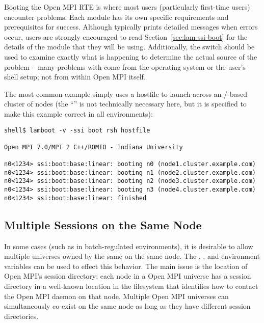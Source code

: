 Booting the Open MPI RTE is where most users (particularly first-time
users) encounter problems.  Each  module has its own
specific requirements and prerequisites for success.  Although
 typically prints detailed messages when errors occur,
users are strongly encouraged to read Section~\ref{sec:lam-ssi-boot}
for the details of the  module that they will be using.
Additionally, the  switch should be used to examine exactly
what is happening to determine the actual source of the problem --
many problems with  come from the operating system or the
user's shell setup; not from within Open MPI itself.

The most common  example simply uses a hostfile to launch
across an /-based cluster of nodes (the
``'' is not technically necessary here, but it
is specified to make this example correct in all environments):

\lstset{style=lam-cmdline}
\begin{lstlisting}
shell$ lamboot -v -ssi boot rsh hostfile

Open MPI 7.0/MPI 2 C++/ROMIO - Indiana University

n0<1234> ssi:boot:base:linear: booting n0 (node1.cluster.example.com)
n0<1234> ssi:boot:base:linear: booting n1 (node2.cluster.example.com)
n0<1234> ssi:boot:base:linear: booting n2 (node3.cluster.example.com)
n0<1234> ssi:boot:base:linear: booting n3 (node4.cluster.example.com)
n0<1234> ssi:boot:base:linear: finished
\end{lstlisting}


\subsection{Multiple Sessions on the Same Node}

In some cases (such as in batch-regulated environments), it is
desirable to allow multiple universes owned by the same on the same
node.  The ,
, and
 environment variables can be
used to effect this behavior.  The main issue is the location of Open MPI's
session directory; each node in a Open MPI universe has a session directory
in a well-known location in the filesystem that identifies how to
contact the Open MPI daemon on that node.  Multiple Open MPI universes can
simultaneously co-exist on the same node as long as they have
different session directories.

